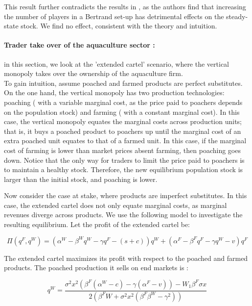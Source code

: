 This result further contradicts the results in \cite{damania_economics_2007}, as the authors find that increasing the number of players in a Bertrand set-up has detrimental effects on the steady-state stock. We find no effect, consistent with the theory and intuition. 
%
\paragraph{Trader take over of the aquaculture sector : }
%
in this section, we look at the 'extended cartel' scenario, where the vertical monopoly takes over the ownership of the aquaculture firm. \\
To gain intuition, assume poached and farmed products are perfect substitutes. On the one hand, the vertical monopoly has two production technologies:  poaching ( with a variable marginal cost, as the price paid to poachers depends on the population stock) and farming ( with a constant marginal cost). In this case, the vertical monopoly equates the marginal costs across production units; that is, it buys a poached product to poachers up until the marginal cost of an extra poached unit equates to that of a farmed unit. In this case, if the marginal cost of farming is lower than market prices absent farming, then poaching goes down. Notice that the only way for traders to limit the price paid to poachers is to maintain a healthy stock. Therefore, the new equilibrium population stock is larger than the initial stock, and poaching is lower.

Now consider the case at stake, where products are imperfect substitutes. In this case, the extended cartel does not only equate marginal costs, as marginal revenues diverge across products. We use the following model to investigate the resulting equilibrium. Let the profit of the extended cartel be:

\begin{equation}
\Pi(q^F, q^W) = (\alpha^W - \beta^W q^W - \gamma q^F - (s+c))q^W + (\alpha^F - \beta^F q^F - \gamma q^W - v)q^F
\end{equation}

The extended cartel maximizes its profit with respect to the poached and farmed products. The poached production it sells on end markets is : 

\begin{equation}
q^W = \frac{\sigma^2 x^2 (\beta^F(\alpha^W -c) - \gamma (\alpha^F - v)) - W_1 \beta^F \sigma x }{2(\beta^F W + \sigma^2 x^2 (\beta^F \beta^W - \gamma^2)) }
\end{equation}

